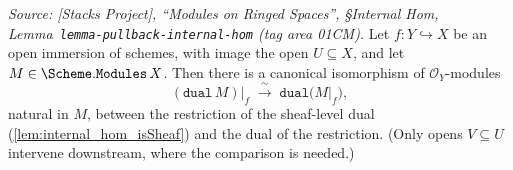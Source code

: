 \begin{lemma}\leanok
  \label{lem:dual_restrict_iso}
  \textit{Source: [Stacks Project], ``Modules on Ringed Spaces'', \S Internal Hom,
  Lemma~\texttt{lemma-pullback-internal-hom} (tag area 01CM).}
  Let \(f : Y \hookrightarrow X\) be an open immersion of schemes, with image the open
  \(U \subseteq X\), and let \(M \in \Scheme.\mathtt{Modules}\,X\). Then there is a
  canonical isomorphism of \(\mathcal{O}_Y\)-modules
  \[
    (\mathtt{dual}\,M)\big|_f \;\xrightarrow{\ \sim\ }\; \mathtt{dual}\bigl(M|_f\bigr),
  \]
  natural in \(M\), between the restriction of the sheaf-level dual
  (\cref{lem:internal_hom_isSheaf}) and the dual of the restriction. (Only opens
  \(V \subseteq U\) intervene downstream, where the comparison is needed.)
\end{lemma}

